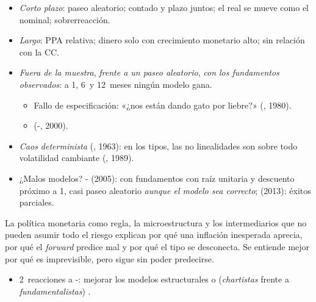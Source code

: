 \documentclass{article}
\begin{document}
\begin{columnas}
\begin{itemize}
\item \emph{Corto plazo}: paseo aleatorio; contado y plazo juntos; el real se mueve como el nominal; sobrerreacción.
\item \emph{Largo}: PPA relativa; dinero solo con crecimiento monetario alto; sin relación con la CC.
\end{itemize}
\begin{itemize}
\item \emph{Fuera de la muestra}, \emph{frente a un paseo aleatorio}, \emph{con los fundamentos observados}: a 1, 6~y 12~meses ningún modelo gana.
  \begin{itemize}
  \item Fallo de especificación: «¿nos están dando gato por liebre?» (, 1980).
  \item {} (-, 2000).
  \end{itemize}
\item \emph{Caos determinista} (, 1963): en los tipos, las no linealidades son sobre todo volatilidad cambiante (, 1989).
\item ¿Malos modelos? - (2005): con fundamentos con raíz unitaria y descuento próximo a 1, casi paseo aleatorio \emph{aunque el modelo sea correcto};  (2013): éxitos parciales.
\end{itemize}

\begin{ideaclave}
La política monetaria como regla, la microestructura y los intermediarios que no pueden asumir todo el riesgo explican por qué una inflación inesperada aprecia, por qué el \emph{forward} predice mal y por qué el tipo se desconecta. Se entiende mejor por qué es imprevisible, pero sigue sin poder predecirse.
\end{ideaclave}
\begin{itemize}
\item 2~reacciones a -: mejorar los modelos estructurales o  (\emph{chartistas} frente a \emph{fundamentalistas}) .
\end{itemize}


\end{columnas}
\end{document}
